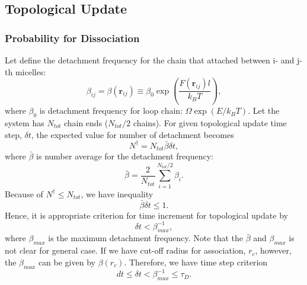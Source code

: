\documentclass[10pt, a4paper]{article}
\begin{document}

\subsection{Topological Update}
\subsubsection{Probability for Dissociation}
Let define the detachment frequency for the chain that attached between i- and j-th micelles:
\begin{equation}
\beta_{ij} = \beta(\mathbf{r}_{ij}) \equiv \beta_0\exp\left(\frac{F(\mathbf{r}_{ij})l}{k_BT}\right),
\end{equation}
where $\beta_0$ is detachment frequency for loop chain: $\Omega\exp(E/k_BT)$.
Let the system has $N_{tot}$ chain ends ($N_{tot}/2$ chains). For given topological update time step, $\delta t$, the expected value for number of detachment becomes 
\begin{equation}
N^\dagger = N_{tot}\bar{\beta}\delta t,
\end{equation}
where $\bar{\beta}$ is number average for the detachment frequency:
\begin{equation}
\bar{\beta} = \frac{2}{N_{tot}} \sum_{i=1}^{N_{tot}/2}\beta_i.
\end{equation}
Because of $N^\dagger \leq N_{tot}$, we have inequality
\begin{equation}
\bar{\beta}{\delta t} \leq 1.
\end{equation}
Hence, it is appropriate criterion for time increment for topological update by
\begin{equation}
\delta t < \beta_{max}^{-1},
\end{equation}
where $\beta_{max}$ is the maximum detachment frequency. Note that the $\bar{\beta}$ and $\beta_{max}$ is not clear for general case. If we have cut-off radius for association, $r_c$, however, the $\beta_{max}$ can be given by $\beta(r_c)$.
Therefore, we have time step criterion
\begin{equation}
dt \leq \delta t < \beta^{-1}_{max} \leq \tau_D.
\end{equation}
\end{document}
